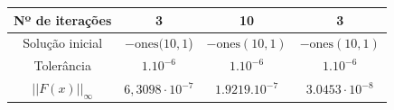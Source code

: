 \documentclass[
	12pt,				%
	oneside,			%
	a4paper,			%
	english,			%
	french,				%
	spanish,			%
	brazil				%
	]{abntex2}
\begin{document}
\begin{table}[h]
\begin{tabular}{|c|c|c|c|}
    \newline Nº de iterações\newline  & 3 & 10 & 3 \\ \hline 
    Solução inicial & \newline $\mathrm{-}\mathrm{ones(10,1}$)\newline  & \newline $\mathrm{-}\mathrm{ones(10,1)}$ & \newline $\mathrm{-}\mathrm{ones(10,1)}$ \\ \hline 
    \newline Tolerância\newline  & ${1.10}^{-6}$ & ${1.10}^{-6}$ & ${1.10}^{-6}$ \\ \hline 
    ${\left|\left|F\left(x\right)\right|\right|}_{\infty }$ & $6,3098\cdot {10}^{-7}$ & $\mathrm{1.9219}{.10}^{-7}$ & $\mathrm{3.0453}\cdot {10}^{-8}$ \\ \hline 
    \end{tabular}
\end{table}

\newpage
\end{document}
